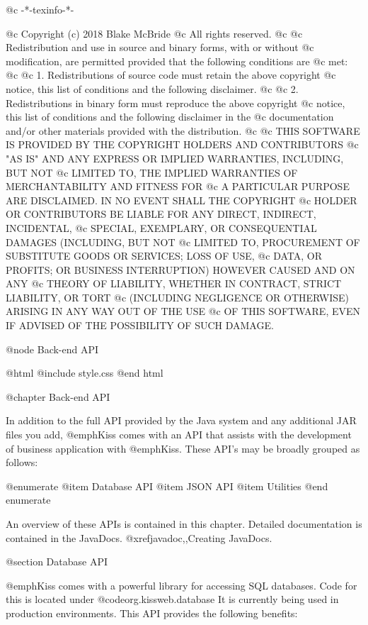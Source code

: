 @c -*-texinfo-*-

@c  Copyright (c) 2018 Blake McBride
@c  All rights reserved.
@c
@c  Redistribution and use in source and binary forms, with or without
@c  modification, are permitted provided that the following conditions are
@c  met:
@c
@c  1. Redistributions of source code must retain the above copyright
@c  notice, this list of conditions and the following disclaimer.
@c
@c  2. Redistributions in binary form must reproduce the above copyright
@c  notice, this list of conditions and the following disclaimer in the
@c  documentation and/or other materials provided with the distribution.
@c
@c  THIS SOFTWARE IS PROVIDED BY THE COPYRIGHT HOLDERS AND CONTRIBUTORS
@c  "AS IS" AND ANY EXPRESS OR IMPLIED WARRANTIES, INCLUDING, BUT NOT
@c  LIMITED TO, THE IMPLIED WARRANTIES OF MERCHANTABILITY AND FITNESS FOR
@c  A PARTICULAR PURPOSE ARE DISCLAIMED. IN NO EVENT SHALL THE COPYRIGHT
@c  HOLDER OR CONTRIBUTORS BE LIABLE FOR ANY DIRECT, INDIRECT, INCIDENTAL,
@c  SPECIAL, EXEMPLARY, OR CONSEQUENTIAL DAMAGES (INCLUDING, BUT NOT
@c  LIMITED TO, PROCUREMENT OF SUBSTITUTE GOODS OR SERVICES; LOSS OF USE,
@c  DATA, OR PROFITS; OR BUSINESS INTERRUPTION) HOWEVER CAUSED AND ON ANY
@c  THEORY OF LIABILITY, WHETHER IN CONTRACT, STRICT LIABILITY, OR TORT
@c  (INCLUDING NEGLIGENCE OR OTHERWISE) ARISING IN ANY WAY OUT OF THE USE
@c  OF THIS SOFTWARE, EVEN IF ADVISED OF THE POSSIBILITY OF SUCH DAMAGE.

@node Back-end API

@html
@include style.css
@end html

@chapter Back-end API

In addition to the full API provided by the Java system and any additional
JAR files you add, @emph{Kiss} comes with an API that assists with the
development of business application with @emph{Kiss}.  These 
API's may be broadly grouped as follows:

@enumerate
@item
Database API
@item
JSON API
@item
Utilities
@end enumerate

An overview of these APIs is contained in this chapter.  Detailed
documentation is contained in the JavaDocs.  @xref{javadoc,,Creating JavaDocs}.

@section Database API

@emph{Kiss} comes with a powerful library for accessing SQL databases.
Code for this is located under @code{org.kissweb.database} It is
currently being used in production environments.  This API provides
the following benefits:

